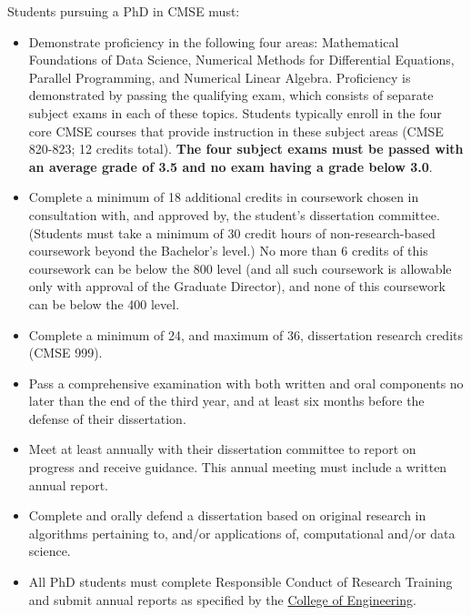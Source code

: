Students pursuing a PhD in CMSE must:

\begin{itemize}
\item  Demonstrate proficiency in the following four areas:
  Mathematical Foundations of Data Science, Numerical Methods for
  Differential Equations, Parallel Programming, and Numerical Linear
  Algebra.  Proficiency is demonstrated by passing the qualifying
  exam, which consists of separate subject exams in each of these
  topics.  Students typically enroll in the four core CMSE courses
  that provide instruction in these subject areas (CMSE 820-823; 12
  credits total).  \textbf{The four subject exams must be passed with an
  average grade of 3.5 and no exam having a grade below 3.0}.

\item Complete a minimum of 18 additional credits in coursework
  chosen in consultation with, and approved by, the student's
  dissertation committee.  (Students must take a minimum of 30 credit
  hours of non-research-based coursework beyond the Bachelor's level.)
  No more than 6 credits of this coursework can be below the 800 level
  (and all such coursework is allowable only with approval of the
  Graduate Director), and none of this coursework can be below the 400
  level.

\item Complete a minimum of 24, and maximum of 36, dissertation
  research credits (CMSE 999).

\item Pass a comprehensive examination with both written and oral
  components no later than the end of the third year, and at least six months before the defense of their
  dissertation.

\item Meet at least annually with their dissertation committee to report on
  progress and receive guidance.  This annual meeting must include a
  written annual report.

\item Complete and orally defend a dissertation based on original
  research in algorithms pertaining to, and/or applications of,
  computational and/or data science.  

\item All PhD students must complete Responsible Conduct of Research
  Training and submit annual reports as specified by the
  \href{https://www.egr.msu.edu/academics/graduate/rcr}{College of
    Engineering}.

\end{itemize}

